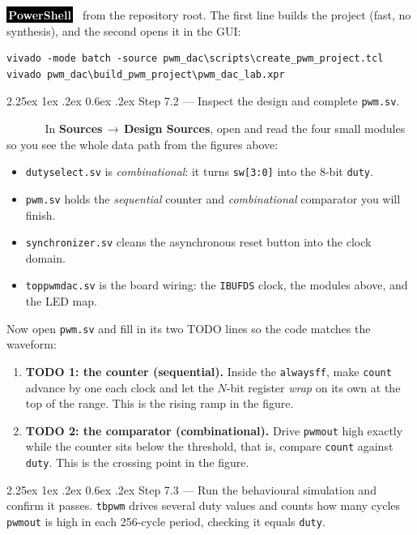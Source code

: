 \documentclass[11pt]{article}
\makeatletter
\newcommand{\guitag}{\colorbox{tudelft}{\textcolor{white}{\footnotesize\bfseries\,GUI\,}}}
\newcommand{\pstag}{\colorbox{black}{\textcolor{white}{\footnotesize\bfseries\,PowerShell\,}}}
\newcommand{\nav}[1]{\textsf{\textbf{#1}}}
\newcommand{\gto}{\,$\rightarrow$\,\allowbreak}
\renewcommand{\_}{\textunderscore\allowbreak}
\renewcommand\paragraph{\@startsection{paragraph}{4}{\z@}%
  {2.25ex \@plus 1ex \@minus .2ex}%
  {0.6ex \@plus .2ex}%
  {\normalfont\normalsize\bfseries}}
\makeatother
\begin{document}
\pstag~ from the repository root. The first line builds the project (fast, no synthesis), and the second
opens it in the GUI:
\begin{lstlisting}[style=ps]
vivado -mode batch -source pwm_dac\scripts\create_pwm_project.tcl
vivado pwm_dac\build_pwm_project\pwm_dac_lab.xpr
\end{lstlisting}

\paragraph{Step 7.2 --- Inspect the design and complete \texttt{pwm.sv}.}

\guitag~ In \nav{Sources}\gto\nav{Design Sources}, open and read the four small modules so you see the
whole data path from the figures above:
\begin{itemize}[noitemsep]
  \item \texttt{duty\_select.sv} is \emph{combinational}: it turns \texttt{sw[3:0]} into the 8-bit \texttt{duty}.
  \item \texttt{pwm.sv} holds the \emph{sequential} counter and \emph{combinational} comparator you will finish.
  \item \texttt{synchronizer.sv} cleans the asynchronous reset button into the clock domain.
  \item \texttt{top\_pwm\_dac.sv} is the board wiring: the \texttt{IBUFDS} clock, the modules above, and the LED map.
\end{itemize}
Now open \texttt{pwm.sv} and fill in its two TODO lines so the code matches the waveform:
\begin{enumerate}[noitemsep]
  \item \textbf{TODO 1: the counter (sequential).} Inside the \texttt{always\_ff}, make \texttt{count}
        advance by one each clock and let the $N$-bit register \emph{wrap} on its own at the top of the
        range. This is the rising ramp in the figure.
  \item \textbf{TODO 2: the comparator (combinational).} Drive \texttt{pwm\_out} high exactly while the
        counter sits below the threshold, that is, compare \texttt{count} against \texttt{duty}. This is the
        crossing point in the figure.
\end{enumerate}

\paragraph{Step 7.3 --- Run the behavioural simulation and confirm it passes.}
\texttt{tb\_pwm} drives several duty values and counts how many cycles \texttt{pwm\_out} is high in each
256-cycle period, checking it equals \texttt{duty}.
\end{document}
